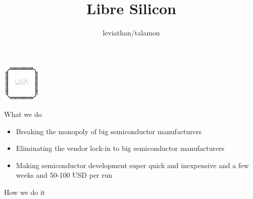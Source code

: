 \documentclass[9pt]{beamer}
\author{leviathan/talamon}
\title{Libre Silicon}
\begin{document}
\begin{frame}
\titlepage
\begin{center}
\includegraphics[width=50pt,height=50pt]{lsa.png}
\end{center}
\end{frame}


\begin{frame}{What we do}
	\begin{itemize}
		\item Breaking the monopoly of big semiconductor manufacturers
		\item Eliminating the vendor lock-in to big semiconductor manufacturers
		\item Making semiconductor development super quick and inexpensive and a few weeks and 50-100 USD per run
	\end{itemize}
\end{frame}

\begin{frame}{How we do it}
\end{frame}
\end{document}
